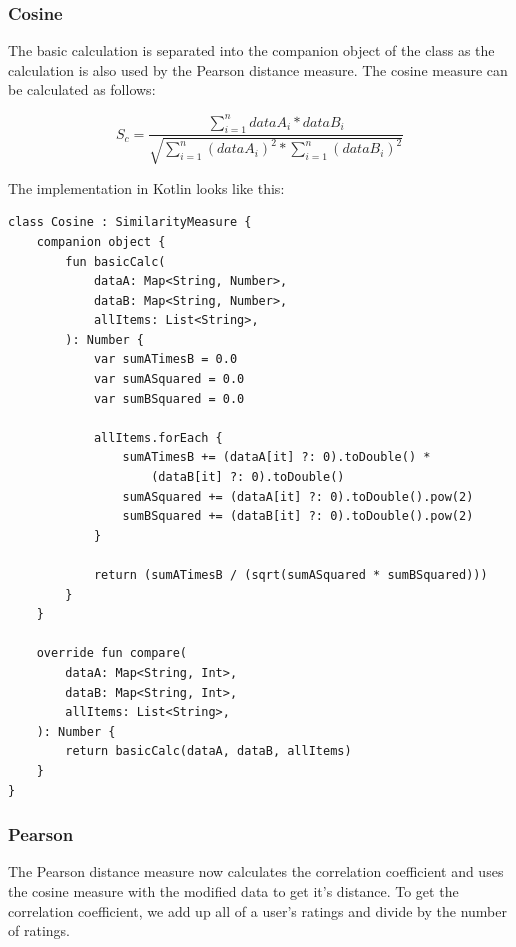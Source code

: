 \subsubsection{Cosine}

The basic calculation is separated into the companion object of the class as the calculation is also used by the Pearson distance measure. The cosine measure can be calculated as follows:

\begin{equation}
S_{c} = \frac{\sum_{i=1}^{n}{dataA_i * dataB_i}}{\sqrt{\sum_{i=1}^{n}{(dataA_i)^2} * \sum_{i=1}^{n}{(dataB_i)^2}}}
\label{eq:cosine}
\end{equation}

The implementation in Kotlin looks like this:

\newpage

\begin{verbatim}
class Cosine : SimilarityMeasure {
    companion object {
        fun basicCalc(
            dataA: Map<String, Number>,
            dataB: Map<String, Number>,
            allItems: List<String>,
        ): Number {
            var sumATimesB = 0.0
            var sumASquared = 0.0
            var sumBSquared = 0.0

            allItems.forEach {
                sumATimesB += (dataA[it] ?: 0).toDouble() * 
                    (dataB[it] ?: 0).toDouble()
                sumASquared += (dataA[it] ?: 0).toDouble().pow(2)
                sumBSquared += (dataB[it] ?: 0).toDouble().pow(2)
            }

            return (sumATimesB / (sqrt(sumASquared * sumBSquared)))
        }
    }

    override fun compare(
        dataA: Map<String, Int>,
        dataB: Map<String, Int>,
        allItems: List<String>,
    ): Number {
        return basicCalc(dataA, dataB, allItems)
    }
}
\end{verbatim}

\subsubsection{Pearson}

The Pearson distance measure now calculates the correlation coefficient and uses the cosine measure with the modified data to get it's distance. To get the correlation coefficient, we add up all of a user's ratings and divide by the number of ratings.

